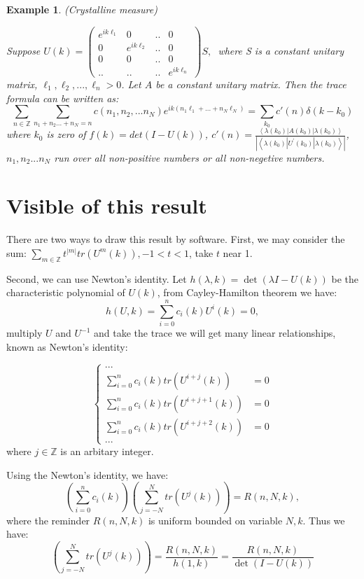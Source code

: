 \documentclass[draft]{article}
\newtheorem{ex}{Example}[section]
\theoremstyle{definition}
\theoremstyle{remark}
\newcommand{\Z}{\mathbb{Z}}
\begin{document}
\begin{ex}(Crystalline measure)
	
	Suppose $U\left(k\right)=\begin{pmatrix}
		e^{ik\ell_1}  & 0 & .. & 0\\
		0 & e^{ik\ell_2} & .. & 0\\
		0 & 0 & ..& 0\\
		.. & .. & ..& e^{ik\ell_n}
	\end{pmatrix}S,\ $
	where S is a constant unitary matrix, $\ell_1,\ell_2,...,\ell_n>0$. Let $A$ be a constant unitary matrix. Then the trace formula can be written as:
	$$
	\sum_{n\in \Z}\sum_{n_1+n_2...+n_N=n} c\left(n_1,n_2,...n_N\right) e^{ik\left(n_1\ell_1+...+n_N\ell_N\right) }=\sum_{k_0}c'\left(n\right) \delta(k-k_0)
	$$
	where $k_0$ is zero of $f\left(k\right)=det\left(I-U\left(k\right)  \right)$, $c'\left(n\right)=\frac{\left \langle \lambda\left (k_0\right )  |A\left (k_0\right ) |\lambda\left (k_0\right )   \right \rangle }{\left | \left \langle \lambda\left (k_0\right )  |U^{'}\left (k_0\right ) |\lambda\left (k_0\right )   \right \rangle \right | }$, $n_1,n_2...n_N$ run over all non-positive numbers or all non-negetive numbers.
\end{ex}

\section{Visible of this result}
 There are two ways to draw this result by software. First, we may consider the sum: $\sum_{m\in \Z}t^{\left|m\right| }tr\left(U^m\left(k\right)\right), -1<t<1$, take $t$ near 1.
 
 Second, we can use Newton's identity. Let $h\left(\lambda,k\right)=\det\left(\lambda I-U\left(k\right) \right) $ be the characteristic polynomial of $U\left(k\right)$, from Cayley-Hamilton theorem we have:
 $$
 h\left(U,k\right)=\sum_{i=0}^{n} c_i\left ( k \right ) U^{i}\left (k\right ) =0,
 $$
 multiply $U$ and $U^{-1}$ and take the trace we will get many linear relationships, known as Newton's identity\cite{silva1998trace}:
 
 $$
 \begin{cases}
 	...  \\
 	\sum_{i=0}^{n} c_i\left ( k \right )tr\left  ( U^{i+j}\left (k\right )\right )&=0  \\
 	\sum_{i=0}^{n} c_i\left ( k \right )tr\left  ( U^{i+j+1}\left (k\right )\right )&=0 \\
 	\sum_{i=0}^{n} c_i\left ( k \right )tr\left  ( U^{i+j+2}\left (k\right )\right )&=0 \\
 	...
 \end{cases} 
 $$
 where $j \in \Z$ is an arbitary integer.
 
 Using the Newton's identity, we have:
 $$
 \left( \sum_{i=0}^{n}c_i\left(k\right)\right)\left(\sum_{j=-N}^{N}tr\left  ( U^{j}\left (k\right )\right )\right)=R\left(n,N,k\right),    
 $$ 
 where the reminder $R\left(n,N,k\right)$ is uniform bounded on variable $N,k$. Thus we have:
 $$
 \left(\sum_{j=-N}^{N}tr\left  ( U^{j}\left (k\right )\right )\right)=\frac{R\left(n,N,k\right)}{h\left(1,k\right)}=\frac{R\left(n,N,k\right)}{\det\left(I-U\left(k\right) \right) }
 $$
 



\end{document}
